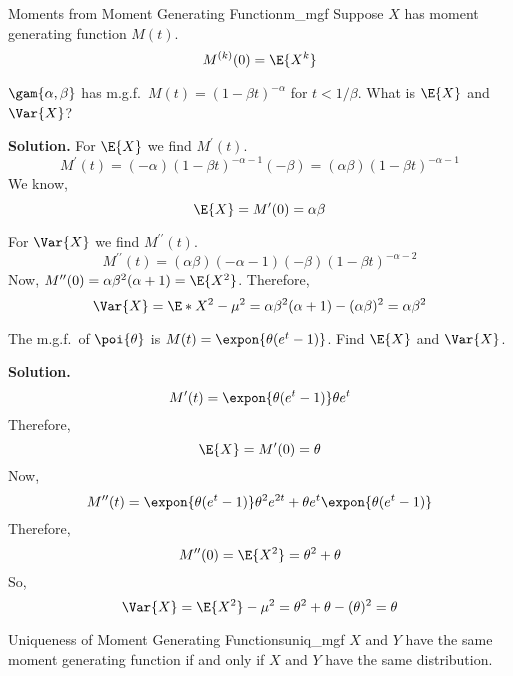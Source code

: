 \begin{Theorem}{Moments from Moment Generating Function}{m_mgf}
    Suppose $ X $ has moment generating function $ M(t) $.
    \[ M^{(k)}(0)=\E{X^k} \]
\end{Theorem}
\begin{Example}{}{}
    $ \gam{\alpha,\beta}$ has m.g.f.\
    $  M(t)=(1-\beta t)^{-\alpha} $
    for $ t<1/\beta $. What is $ \E{X} $ and $ \Var{X} $?

    \textbf{Solution.} For $ \E{X} $ we find $ M^\prime(t) $.
    \[ M^\prime(t)=(-\alpha)(1-\beta t)^{-\alpha-1}(-\beta)=
        (\alpha \beta)(1-\beta t)^{-\alpha-1} \]
    We know,
    \[ \E{X}=M^\prime(0)=\alpha\beta \]

    For $ \Var{X} $ we find $ M^{\prime\prime}(t) $.
    \[ M^{\prime\prime}(t)=(\alpha\beta)(-\alpha-1)(-\beta)(1-\beta t)^{-\alpha-2} \]
    Now, $ M^{\prime\prime}(0)=\alpha\beta^2(\alpha+1) =\E{X^2} $. Therefore,
    \[ \Var{X}=\E*{X^2}-\mu^2=\alpha\beta^2(\alpha+1)-(\alpha\beta)^2=\alpha\beta^2 \]
\end{Example}

\begin{Example}{}{}
    The m.g.f.\ of $ \poi{\theta} $ is $ M(t)=\expon{\theta(e^t-1)} $.
    Find $ \E{X} $ and $ \Var{X} $.

    \textbf{Solution.}
    \[ M^\prime(t)=\expon{\theta(e^t-1)}\theta e^t \]
    Therefore,
    \[ \E{X}=M^\prime(0)=\theta \]
    Now,
    \[ M^{\prime\prime}(t)=
        \expon{\theta(e^t-1)}\theta^2 e^{2t}+\theta e^t
        \expon{\theta(e^t-1)} \]
    Therefore,
    \[ M^{\prime\prime}(0)=\E{X^2}=\theta^2+\theta \]
    So,
    \[ \Var{X}=\E{X^2}-\mu^2=\theta^2+\theta-(\theta)^2=\theta \]
\end{Example}

\begin{Theorem}{Uniqueness of Moment Generating Functions}{uniq_mgf}
    $ X $ and $ Y $ have the same moment generating function if and only if
    $ X $ and $ Y $ have the same distribution.
\end{Theorem}

